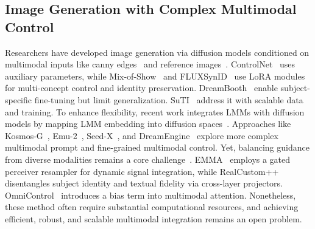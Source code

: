 \subsection{Image Generation with Complex Multimodal Control}
Researchers have developed image generation via diffusion models conditioned on multimodal inputs like canny edges~\citep{controlnet} and reference images~\citep{ultraEdit,SDEdit}. ControlNet~\citep{controlnet} uses auxiliary parameters, while Mix-of-Show~\citep{Mix-of-Show} and FLUXSynID~\citep{FLUXSynID} use LoRA modules for multi-concept control and identity preservation.
DreamBooth~\citep{ruiz2023dreamboothfinetuningtexttoimage} enable subject-specific fine-tuning but limit generalization. SuTI~\citep{suti} address it with scalable data and training.
To enhance flexibility, recent work integrates LMMs with diffusion models by mapping LMM embedding into diffusion spaces~\citep{koh2023GILL,sun2023emu1,dreamllm,unimo}. Approaches like Kosmos-G~\citep{Kosmos-G}, Emu-2~\citep{emu2}, Seed-X~\citep{2024SeedX}, and DreamEngine~\citep{dreamengine} explore more complex multimodal prompt and fine-grained multimodal control. Yet, balancing guidance from diverse modalities remains a core challenge~\citep{han2024emmatexttoimagediffusionmodel,ye2023ip-adapter,RealCustom++}. 
EMMA~\citep{han2024emmatexttoimagediffusionmodel} employs a gated perceiver resampler for dynamic signal integration, while RealCustom++\citep{RealCustom++} disentangles subject identity and textual fidelity via cross-layer projectors. OmniControl~\citep{OminiControl} introduces a bias term into multimodal attention. 
Nonetheless, these method often require substantial computational resources, and achieving efficient, robust, and scalable multimodal integration remains an open problem.



